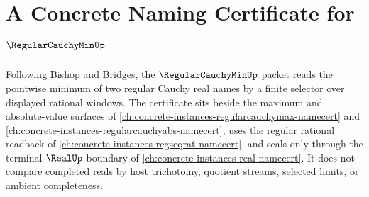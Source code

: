 \chapter{A Concrete Naming Certificate for $\RegularCauchyMinUp$}
\label{ch:concrete-instances-regularcauchymin-namecert}

Following Bishop and Bridges, the $\RegularCauchyMinUp$ packet reads the pointwise minimum of two regular Cauchy real names by a finite selector over displayed rational windows. The certificate sits beside the maximum and absolute-value surfaces of \autoref{ch:concrete-instances-regularcauchymax-namecert} and \autoref{ch:concrete-instances-regularcauchyabs-namecert}, uses the regular rational readback of \autoref{ch:concrete-instances-regseqrat-namecert}, and seals only through the terminal $\RealUp$ boundary of \autoref{ch:concrete-instances-real-namecert}. It does not compare completed reals by host trichotomy, quotient streams, selected limits, or ambient completeness.

